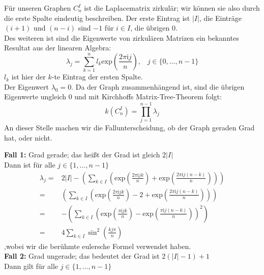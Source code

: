 Für unseren Graphen $C_n^I$ ist die Laplacematrix zirkulär; wir können sie also durch die erste Spalte eindeutig beschreiben. Der erste Eintrag ist $|I|$, die Einträge $(i+1)$  und $(n-i)$ sind $-1$ für $i \in I$, die übrigen $0$.\\
Des weiteren ist sind die Eigenwerte von zirkulären Matrizen ein bekanntes Resultat aus der linearen Algebra:
\begin{equation}
 \lambda_j = \sum_{k=1}^{n}l_k\mathrm{exp}{\left(\frac{2\pi \mathrm{i}j}{n}\right)}, \,\,\,\,\, {j\in\{0,\ldots,n-1\}}
\end{equation}
$l_k$ ist hier der $k$-te Eintrag der ersten Spalte.\\ 
Der Eigenwert $\lambda_0 = 0$. Da der Graph zusammenhängend ist, sind die übrigen Eigenwerte ungleich $0$ und mit Kirchhoffs Matrix-Tree-Theorem folgt:
\begin{equation}
 \mathit{k}(C_n^I)=\prod_{j=1}^{n-1} \lambda_j
\end{equation}
An dieser Stelle machen wir die Fallunterscheidung, ob der Graph geraden Grad hat, oder nicht.\\
\par
\begingroup
\leftskip=20pt
\rightskip=20pt
\noindent
\textbf{Fall 1:} Grad gerade; das heißt der Grad ist gleich $2|I|$\\
Dann ist für alle $j \in \{1,\ldots,n-1\}$
\begin{equation}
\begin{aligned}
 \lambda_j = {} & {2|I| - \left( \sum_{k\in I}\left(\mathrm{exp}{\left(\frac{2\pi \mathrm{i}jk}{n}\right)} + \mathrm{exp}{\left(\frac{2\pi \mathrm{i}j(n-k)}{n}\right)}\right)\right)}\\
 = {} & {\left( \sum_{k\in I}\left(\mathrm{exp}{\left(\frac{2\pi \mathrm{i}jk}{n}\right)} - 2 + \mathrm{exp}{\left(\frac{2\pi \mathrm{i}j(n-k)}{n}\right)}\right)\right)}\\
 = {} &-\left( \sum_{k\in I}\left(\mathrm{exp}{\left(\frac{\pi \mathrm{i}jk}{n}\right)} - \mathrm{exp}{\left(\frac{\pi \mathrm{i}j(n-k)}{n}\right)}\right)^2\right)\\
 ={} & 4\sum_{k\in I} \sin^2 \left( \frac{kj\pi}{n}\right)
 \end{aligned}
\end{equation}
,wobei wir die berühmte eulersche Formel verwendet haben.\\
 \textbf{Fall 2:} Grad ungerade; das bedeutet der Grad ist $2(|I|-1) + 1$\\
Dann gilt für alle $j \in \{1,\ldots,n-1\}$
\small
